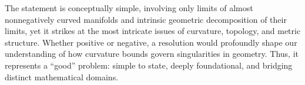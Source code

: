 The statement is conceptually simple, involving only limits of almost nonnegatively curved manifolds and intrinsic geometric decomposition of their limits, yet it strikes at the most intricate issues of curvature, topology, and metric structure. Whether positive or negative, a resolution would profoundly shape our understanding of how curvature bounds govern singularities in geometry. Thus, it represents a “good” problem: simple to state, deeply foundational, and bridging distinct mathematical domains.
